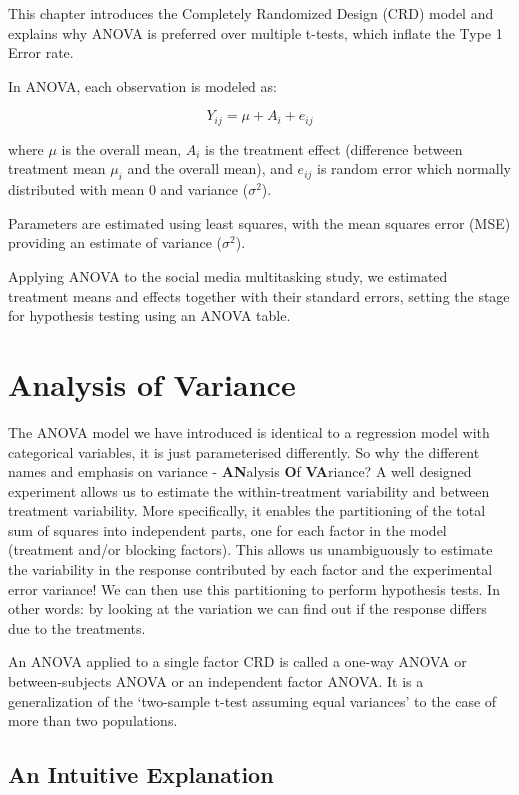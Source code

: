 \documentclass[
  letterpaper,
]{book}
\begin{document}
This chapter introduces the Completely Randomized Design (CRD) model and
explains why ANOVA is preferred over multiple t-tests, which inflate the
Type 1 Error rate.

In ANOVA, each observation is modeled as:

\[
Y_{ij} = \mu + A_{i} + e_{ij}
\]

where \(\mu\) is the overall mean, \(A_{i}\) is the treatment effect
(difference between treatment mean \(\mu_i\) and the overall mean), and
\(e_{ij}\) is random error which normally distributed with mean 0 and
variance (\(\sigma^2\)).

Parameters are estimated using least squares, with the mean squares
error (MSE) providing an estimate of variance (\(\sigma^2\)).

Applying ANOVA to the social media multitasking study, we estimated
treatment means and effects together with their standard errors, setting
the stage for hypothesis testing using an ANOVA table.

\chapter{Analysis of Variance}\label{analysis-of-variance}

The ANOVA model we have introduced is identical to a regression model
with categorical variables, it is just parameterised differently. So why
the different names and emphasis on variance - \textbf{AN}alysis
\textbf{O}f \textbf{VA}riance? A well designed experiment allows us to
estimate the within-treatment variability and between treatment
variability. More specifically, it enables the partitioning of the total
sum of squares into independent parts, one for each factor in the model
(treatment and/or blocking factors). This allows us unambiguously to
estimate the variability in the response contributed by each factor and
the experimental error variance! We can then use this partitioning to
perform hypothesis tests. In other words: by looking at the variation we
can find out if the response differs due to the treatments.

An ANOVA applied to a single factor CRD is called a one-way ANOVA or
between-subjects ANOVA or an independent factor ANOVA. It is a
generalization of the `two-sample t-test assuming equal variances' to
the case of more than two populations.

\section{An Intuitive Explanation}\label{an-intuitive-explanation}
\end{document}
